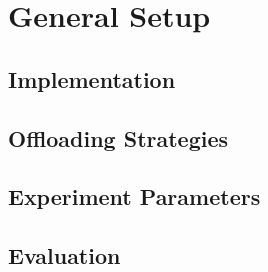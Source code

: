 \chapter{General Setup}

\section{Implementation}

\section{Offloading Strategies}

\section{Experiment Parameters}

\section{Evaluation}
